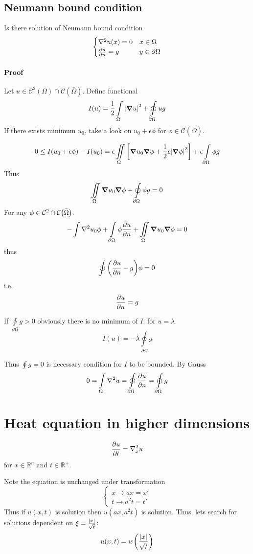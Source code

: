 \subsection{Neumann bound condition}
Is there solution of Neumann bound condition
$$\begin{cases}
\laplacian{u} (x) = 0 & x \in \Omega\\
\pdv{u}{n} (y)= g & y\in \partial \Omega
\end{cases}$$
\paragraph{Proof}
Let $ u \in \mathcal{C}^2(\Omega) \cap \mathcal{C} (\bar{\Omega})$. Define functional
$$I(u)  = \frac{1}{2} \int\limits_{\Omega} \abs{\grad{u}}^2 + \oint\limits_{\partial\Omega} ug $$ 
If there exists minimum $u_0$, take a look on $u_0 + \epsilon \phi$ for $\phi \in \mathcal{C}(\bar{\Omega})$.

$$0 \leq I(u_0+\epsilon \phi) - I(u_0) = \epsilon \iint\limits_{ \Omega} \qty[\grad{u_0} \grad{\phi} +\frac{1}{2} \epsilon\abs{\grad \phi}^2]+ \epsilon \int\limits_{\partial\Omega} \phi g $$
Thus
$$\iint\limits_{ \Omega} \grad{u_0} \grad{\phi} + \oint\limits_{ \partial \Omega} \phi g = 0$$
For any $\phi \in \mathcal{C}^2 \cap \mathcal{C}\qty(\bar{\Omega})$.
$$-\int \laplacian u_0 \phi + \int\limits_{ \partial \Omega} \phi \pdv{u}{n} + \iint\limits_{ \Omega} \grad{u_0} \grad{\phi} = 0$$
thus
$$\oint\qty(\pdv{u}{n}-g)\phi = 0$$
i.e.
$$\pdv{u}{n} = g$$




If $\oint\limits_{\partial \Omega} g>0 $ obviously there is no minimum of $I$:
for $u=\lambda$
$$I(u) = - \lambda \oint\limits_{\partial \Omega} g$$


Thus $\oint g = 0$ is necessary condition for $I$ to be bounded. By Gauss
$$0 = \int\limits_{ \Omega} \laplacian{u} = \oint\limits_{ \partial\Omega} \pdv{u}{n} = \oint\limits_{ \partial\Omega} g $$


\section{Heat equation in higher dimensions}
$$\pdv{u}{t} = \laplacian_x{u}$$
for $x\in \mathbb{R}^n$ and $t\in \mathbb{R}^+$.

Note the equation is unchanged under transformation 
$$\begin{cases}
x \to ax= x'\\
t \to a^2t = t'
\end{cases}$$
Thus if $u(x,t)$ is solution then $u(ax, a^2t)$ is solution. Thus, lets search for solutions dependent on
$\xi = \frac{\abs{x}}{\sqrt{t}}$:
$$u(x,t) = w\qty(\frac{\abs{x}}{\sqrt{t}})$$

